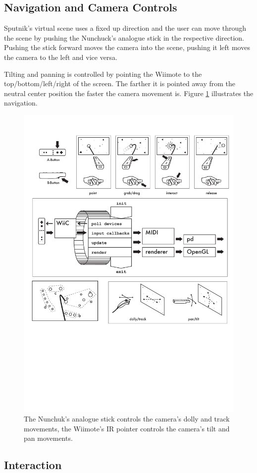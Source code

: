 \documentclass[10pt,a4paper]{scrartcl}
\begin{document}
\subsection{Navigation and Camera Controls}
Sputnik's virtual scene uses a fixed up direction and the user can move through the scene by pushing the Nunchuck's analogue stick in the respective direction. Pushing the stick forward moves the camera into the scene, pushing it left moves the camera to the left and vice versa.

Tilting and panning is controlled by pointing the Wiimote to the top/bottom/left/right of the screen. The farther it is pointed away from the neutral center position the faster the camera movement is. Figure \ref{fig:sputnik-navigation} illustrates the navigation.

\begin{figure}[hbtp]
\begin{center}
\includegraphics[width=0.7\columnwidth]{img/navigation}
\caption{The Nunchuk's analogue stick controls the camera's dolly and track movements, the Wiimote's IR pointer controls the camera's tilt and pan movements.}
\label{fig:sputnik-navigation}
\end{center}
\end{figure}




\subsection{Interaction}
\end{document}
